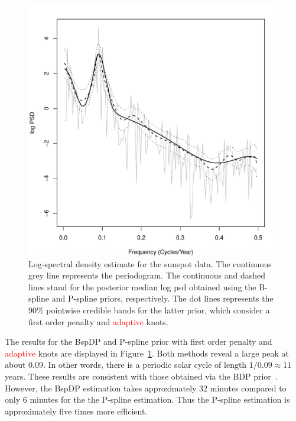 \documentclass[twocolumn,final]{svjour3}
\begin{document}
\begin{figure}[]
	\centering
	\includegraphics[scale=0.40,clip=true,angle=0]{sunspot.pdf}
	\caption{Log-spectral density estimate for the sunspot data. The continuous grey line represents the periodogram.  The continuous and dashed lines stand for the posterior median log psd obtained using the B-spline and P-spline priors, respectively.  The dot lines represents the 90\% pointwise credible bands for the latter prior, which consider a first order penalty and \textcolor{red}{adaptive} knots.}
	\label{fig:sunspot}
\end{figure}


The results for the BspDP and P-spline prior  with first order penalty and \textcolor{red}{adaptive}  knots are displayed in Figure~\ref{fig:sunspot}.  Both methods reveal a large peak at about 0.09. In other words, there is a periodic solar cycle of length $1/ 0.09 \approx 11$ years.  These results are consistent with those obtained via the BDP  prior~\citep{Choudhuri:2004}.
However, the BspDP estimation takes approximately 32 minutes compared to only 6 minutes for the the P-spline estimation. Thus the P-spline estimation is approximately
five times more efficient.
\end{document}

